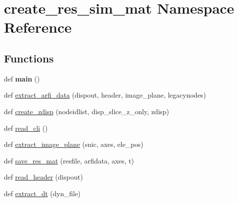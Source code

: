 \hypertarget{namespacecreate__res__sim__mat}{}\section{create\+\_\+res\+\_\+sim\+\_\+mat Namespace Reference}
\label{namespacecreate__res__sim__mat}
\subsection*{Functions}
\begin{DoxyCompactItemize}
\item 
\hypertarget{namespacecreate__res__sim__mat_a606ad8a6d39174adbd2f7253ff733e2a}{}def {\bfseries main} ()\label{namespacecreate__res__sim__mat_a606ad8a6d39174adbd2f7253ff733e2a}

\item 
def \hyperlink{namespacecreate__res__sim__mat_af9dabec2b0d66834aaeae1dd2f6ae588}{extract\+\_\+arfi\+\_\+data} (dispout, header, image\+\_\+plane, legacynodes)
\item 
def \hyperlink{namespacecreate__res__sim__mat_a1731cdac3ad0afae24ea3d88ac5a3471}{create\+\_\+zdisp} (nodeidlist, disp\+\_\+slice\+\_\+z\+\_\+only, zdisp)
\item 
def \hyperlink{namespacecreate__res__sim__mat_a8237a5569e44ddf490f7d2173a4c56b3}{read\+\_\+cli} ()
\item 
def \hyperlink{namespacecreate__res__sim__mat_a36991d38a13e1cd603d67d13c549fa04}{extract\+\_\+image\+\_\+plane} (snic, axes, ele\+\_\+pos)
\item 
def \hyperlink{namespacecreate__res__sim__mat_a36ca0c809441bb01f607af61cc483e2e}{save\+\_\+res\+\_\+mat} (resfile, arfidata, axes, t)
\item 
def \hyperlink{namespacecreate__res__sim__mat_ace51ce9387ce5b304b797688375f06af}{read\+\_\+header} (dispout)
\item 
def \hyperlink{namespacecreate__res__sim__mat_aeae3e50426069c6b90f8f4314bdde1a9}{extract\+\_\+dt} (dyn\+\_\+file)
\end{DoxyCompactItemize}


